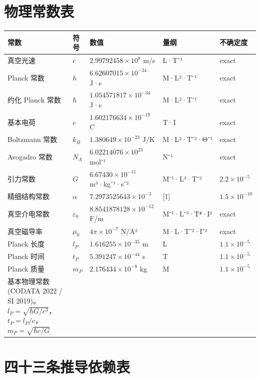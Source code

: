 \documentclass[11pt,a4paper,openany]{book}
\begin{document}
\chapter{物理常数表}
\label{app:constants}
\begin{center}
\footnotesize
\begin{longtable}{p{2.2cm}p{1.5cm}p{4cm}p{3.5cm}p{3cm}}
\toprule
\textbf{常数} & \textbf{符号} & \textbf{数值} & \textbf{量纲} & \textbf{不确定度} \\
\midrule
真空光速 & $c$ & $2.99792458\times10^8$ m/s & L·T⁻¹ & exact \\
Planck 常数 & $h$ & $6.62607015\times10^{-34}$ J·s & M·L²·T⁻¹ & exact \\
约化 Planck 常数 & $\hbar$ & $1.054571817\times10^{-34}$ J·s & M·L²·T⁻¹ & exact \\
基本电荷 & $e$ & $1.602176634\times10^{-19}$ C & T·I & exact \\
Boltzmann 常数 & $k_B$ & $1.380649\times10^{-23}$ J/K & M·L²·T⁻²·Θ⁻¹ & exact \\
Avogadro 常数 & $N_A$ & $6.02214076\times10^{23}$ mol⁻¹ & N⁻¹ & exact \\
引力常数 & $G$ & $6.67430\times10^{-11}$ m³·kg⁻¹·s⁻² & M⁻¹·L³·T⁻² & $2.2\times10^{-5}$ \\
精细结构常数 & $\alpha$ & $7.2973525643\times10^{-3}$ & [1] & $1.5\times10^{-10}$ \\
真空介电常数 & $\varepsilon_0$ & $8.8541878128\times10^{-12}$ F/m & M⁻¹·L⁻³·T⁴·I² & exact \\
真空磁导率 & $\mu_0$ & $4\pi\times10^{-7}$ N/A² & M·L·T⁻²·I⁻² & exact \\
Planck 长度 & $l_P$ & $1.616255\times10^{-35}$ m & L & $1.1\times10^{-5}$ \\
Planck 时间 & $t_P$ & $5.391247\times10^{-44}$ s & T & $1.1\times10^{-5}$ \\
Planck 质量 & $m_P$ & $2.176434\times10^{-8}$ kg & M & $1.1\times10^{-5}$ \\
\bottomrule
\caption{基本物理常数 (CODATA 2022 / SI 2019)。\\
$l_P=\sqrt{\hbar G/c^3}$，$t_P=l_P/c$，$m_P=\sqrt{\hbar c/G}$}
\end{longtable}
\end{center}

\chapter{四十三条推导依赖表}
\label{app:laws}
\end{document}
